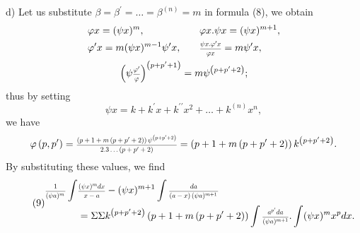 \documentclass[oneside, 12 pt, leqno]{memoir}
\let\oldfrac\frac
\def\frac#1#2{\mathchoice{\text{\scalebox{.83}{${\oldfrac{#1}{#2}}$}}}{\text{\scalebox{.83}{${\displaystyle\oldfrac{#1}{#2}}$}}}{\genfrac{}{}{}{2}{#1}{#2}}{\genfrac{}{}{}{3}{#1}{#2}}}
\begin{document}
d) Let us substitute \(\beta=\beta^{\prime}=\ldots=\beta^{(n)}=m\) in formula (8), we obtain
\[\begin{gathered}
\begin{aligned}
 &\varphi x=(\psi x)^m, &&\quad  \varphi x. \psi x=(\psi x)^{m+1}, \\
 &\varphi^{\prime} x=m(\psi x)^{m-1} \psi^{\prime} x, &&\quad \frac{\psi x. \varphi^{\prime} x}{\varphi x}=m \psi^{\prime} x,
 \end{aligned} \\
\left(\psi \frac{\varphi^{\prime}}{\varphi}\right)^{\left(p+p^{\prime}+1\right)}=m \psi^{\left(p+p^{\prime}+2\right)};
\end{gathered}\]
thus by setting
\[\psi x=k+k^{\prime} x+k^{\prime \prime} x^2+\ldots+k^{(n)} x^n,\]
we have
\[\varphi\left(p, p^{\prime}\right)=\frac{\left(p+1+m\left(p+p^{\prime}+2\right)\right) \psi^{\left(p+p^{\prime}+2\right)}}{2.3 \ldots\left(p+p^{\prime}+2\right)}=\left(p+1+m\left(p+p^{\prime}+2\right)\right) k^{\left(p+p^{\prime}+2\right)}.\]
By substituting these values, we find
\[\tag{9} \begin{aligned}
 \frac{1}{\left(\psi a)^m\right.} \int &\frac{(\psi x)^m d x}{x-a}-(\psi x)^{m+1} \int \frac{d a}{(a-x)\left(\psi a)^{m+1}\right.} \\
&=\Sigma \Sigma k^{\left(p+p^{\prime}+2\right)}\left(p+1+m\left(p+p^{\prime}+2\right)\right) \int \frac{a^{p^{\prime}} d a}{ (\psi a)^{m+1}}. \int(\psi x)^m x^p d x.
\end{aligned}\]
\end{document}
